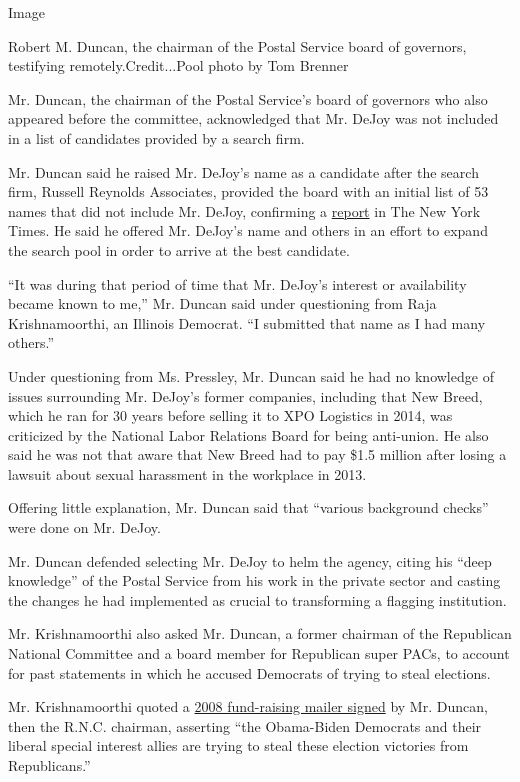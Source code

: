 Image

Robert M. Duncan, the chairman of the Postal Service board of governors,
testifying remotely.Credit...Pool photo by Tom Brenner

Mr. Duncan, the chairman of the Postal Service's board of governors who
also appeared before the committee, acknowledged that Mr. DeJoy was not
included in a list of candidates provided by a search firm.

Mr. Duncan said he raised Mr. DeJoy's name as a candidate after the
search firm, Russell Reynolds Associates, provided the board with an
initial list of 53 names that did not include Mr. DeJoy, confirming a
\href{https://slack-redir.net/link?url=https\%3A\%2F\%2Fwww.nytimes3xbfgragh.onion\%2F2020\%2F08\%2F19\%2Fbusiness\%2Feconomy\%2Fpostal-service-changes-dejoy.html}{report}
in The New York Times. He said he offered Mr. DeJoy's name and others in
an effort to expand the search pool in order to arrive at the best
candidate.

``It was during that period of time that Mr. DeJoy's interest or
availability became known to me,'' Mr. Duncan said under questioning
from Raja Krishnamoorthi, an Illinois Democrat. ``I submitted that name
as I had many others.''

Under questioning from Ms. Pressley, Mr. Duncan said he had no knowledge
of issues surrounding Mr. DeJoy's former companies, including that New
Breed, which he ran for 30 years before selling it to XPO Logistics in
2014, was criticized by the National Labor Relations Board for being
anti-union. He also said he was not that aware that New Breed had to pay
\$1.5 million after losing a lawsuit about sexual harassment in the
workplace in 2013.

Offering little explanation, Mr. Duncan said that ``various background
checks'' were done on Mr. DeJoy.

Mr. Duncan defended selecting Mr. DeJoy to helm the agency, citing his
``deep knowledge'' of the Postal Service from his work in the private
sector and casting the changes he had implemented as crucial to
transforming a flagging institution.

Mr. Krishnamoorthi also asked Mr. Duncan, a former chairman of the
Republican National Committee and a board member for Republican super
PACs, to account for past statements in which he accused Democrats of
trying to steal elections.

Mr. Krishnamoorthi quoted a
\href{https://slack-redir.net/link?url=https\%3A\%2F\%2Fwww.cnn.com\%2F2008\%2FPOLITICS\%2F11\%2F14\%2Frnc.chair\%2Findex.html}{2008
fund-raising mailer signed} by Mr. Duncan, then the R.N.C. chairman,
asserting ``the Obama-Biden Democrats and their liberal special interest
allies are trying to steal these election victories from Republicans.''

